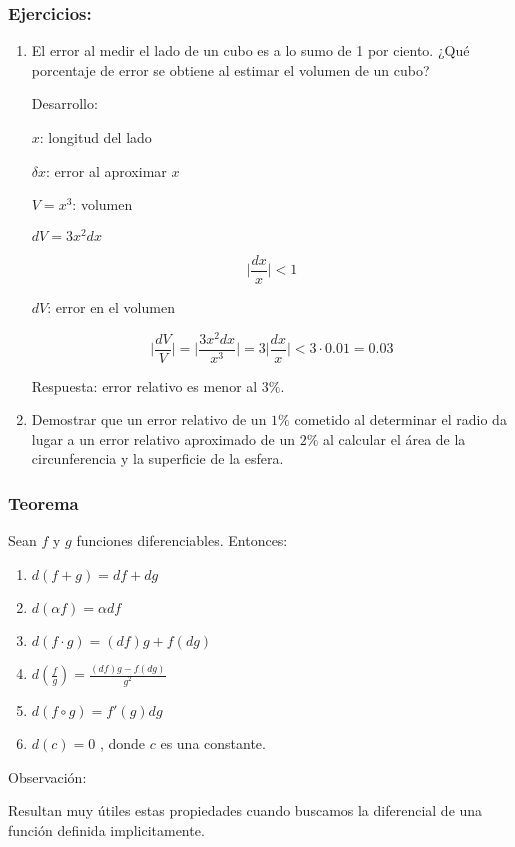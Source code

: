\documentclass[utf8x]{beamer}
\begin{document}
\begin{frame}
\frametitle{Ejercicios:}

\begin{enumerate}
\item
El error al medir el lado de un cubo es a lo sumo de 1 por ciento.
 ¿Qué   porcentaje de error se obtiene al estimar el
volumen de un cubo?

Desarrollo:


$x$: longitud del lado

$\delta x$: error al aproximar $x$

$V=x^3$: volumen

$dV=3x^2 dx$

$$\vert \frac{dx}{x}\vert < 1$$

$dV$: error en el  volumen

$$\vert\frac{dV}{V}\vert =\vert\frac{3x^2dx}{x^3}\vert=
3\vert\frac{dx}{x}\vert < 3\cdot 0.01=0.03$$

Respuesta: error relativo  es menor al  $3\%$.
	
\item
Demostrar que un error relativo de un $1\%$ cometido al determinar el radio da lugar a un error relativo aproximado de un $2\%$ al calcular el área de la  circunferencia y la superficie de la esfera.

\end{enumerate}

\end{frame}




\begin{frame}
\frametitle{Teorema}

Sean $f$ y $g$ funciones diferenciables. Entonces:

\begin{enumerate}
\item
$d(f+g) = df + dg$

\item
$d(\alpha f) =   \alpha df$

\item
$ d(f \cdot g) = (df)g + f(dg)$

\item
$ d(\frac{f}{g}) = \frac{(df)g - f(dg) }{g^2}$

\item
$ d(f \circ g) = f'(g) dg  $

\item
$d (c)  = 0$ ,  donde $c$ es una constante.
\end{enumerate}


Observación:

Resultan muy útiles estas propiedades cuando buscamos la diferencial de una función definida implicitamente.

\end{frame}
\end{document}
